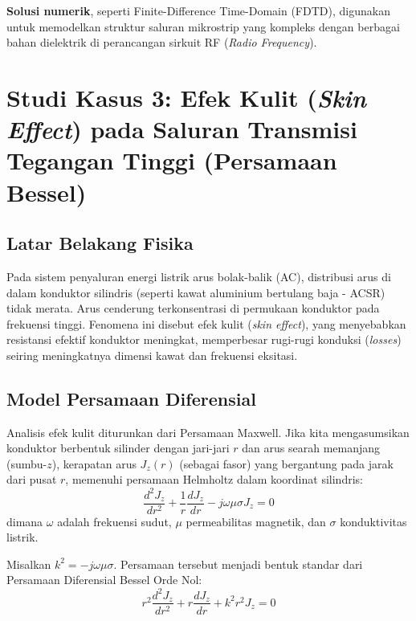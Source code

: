 \documentclass[12pt,a4paper]{article}
\theoremstyle{definition}
\begin{document}
\textbf{Solusi numerik}, seperti Finite-Difference Time-Domain (FDTD), digunakan untuk memodelkan struktur saluran mikrostrip yang kompleks dengan berbagai bahan dielektrik di perancangan sirkuit RF (\textit{Radio Frequency}).

\section{Studi Kasus 3: Efek Kulit (\textit{Skin Effect}) pada Saluran Transmisi Tegangan Tinggi (Persamaan Bessel)}

\subsection{Latar Belakang Fisika}
Pada sistem penyaluran energi listrik arus bolak-balik (AC), distribusi arus di dalam konduktor silindris (seperti kawat aluminium bertulang baja - ACSR) tidak merata. Arus cenderung terkonsentrasi di permukaan konduktor pada frekuensi tinggi. Fenomena ini disebut efek kulit (\textit{skin effect}), yang menyebabkan resistansi efektif konduktor meningkat, memperbesar rugi-rugi konduksi (\textit{losses}) seiring meningkatnya dimensi kawat dan frekuensi eksitasi.

\subsection{Model Persamaan Diferensial}
Analisis efek kulit diturunkan dari Persamaan Maxwell. Jika kita mengasumsikan konduktor berbentuk silinder dengan jari-jari $r$ dan arus searah memanjang (sumbu-$z$), kerapatan arus $J_z(r)$ (sebagai fasor) yang bergantung pada jarak dari pusat $r$, memenuhi persamaan Helmholtz dalam koordinat silindris:
\begin{equation}
    \frac{d^2 J_z}{dr^2} + \frac{1}{r} \frac{d J_z}{dr} - j\omega\mu\sigma J_z = 0
\end{equation}
dimana $\omega$ adalah frekuensi sudut, $\mu$ permeabilitas magnetik, dan $\sigma$ konduktivitas listrik.

Misalkan $k^2 = -j\omega\mu\sigma$. Persamaan tersebut menjadi bentuk standar dari Persamaan Diferensial Bessel Orde Nol:
\begin{equation}
    r^2 \frac{d^2 J_z}{dr^2} + r \frac{d J_z}{dr} + k^2 r^2 J_z = 0
\end{equation}
\end{document}
